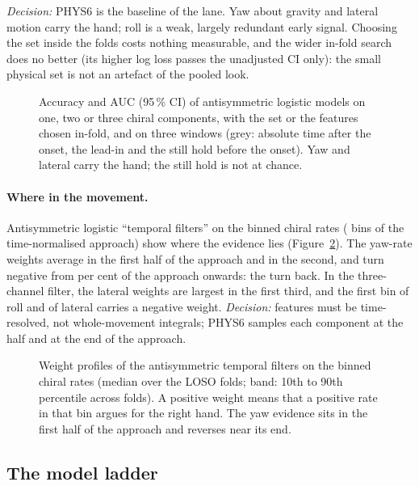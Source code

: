 \emph{Decision:} PHYS6 is the baseline of the lane. Yaw about gravity and lateral motion carry the
hand; roll is a weak, largely redundant early signal. Choosing the set inside the folds costs nothing
measurable, and the wider in-fold search does no better (its higher log loss passes the unadjusted CI
only): the small physical set is not an artefact of the pooled look.

\begin{figure}[tbp]
  \centering
  \caption{Accuracy and AUC (95\,\% CI) of antisymmetric logistic models on one, two or three chiral
  components, with the set or the features chosen in-fold, and on three windows (grey: absolute time
  after the onset, the lead-in and the still hold before the onset). Yaw and lateral carry the hand;
  the still hold is not at chance.}
  \label{fig:M1_04_channel_sets}
\end{figure}

\paragraph{Where in the movement.} Antisymmetric logistic ``temporal filters'' on the binned chiral
rates ( bins of the time-normalised approach) show where the evidence lies
(Figure~\ref{fig:M1_06_temporal_filter}). The yaw-rate weights average  in the
first half of the approach and  in the second, and turn negative from
 per cent of the approach onwards: the turn back. In the three-channel filter, the
lateral weights are largest in the first third, and the first bin of roll and of lateral carries a
negative weight. \emph{Decision:} features must be time-resolved, not whole-movement integrals; PHYS6
samples each component at the half and at the end of the approach.

\begin{figure}[tbp]
  \centering
  \caption{Weight profiles of the antisymmetric temporal filters on the binned chiral rates (median
  over the  LOSO folds; band: 10th to 90th percentile across folds). A positive
  weight means that a positive rate in that bin argues for the right hand. The yaw evidence sits in
  the first half of the approach and reverses near its end.}
  \label{fig:M1_06_temporal_filter}
\end{figure}

\FloatBarrier
\subsection{The model ladder}\label{app:m1:ladder}

